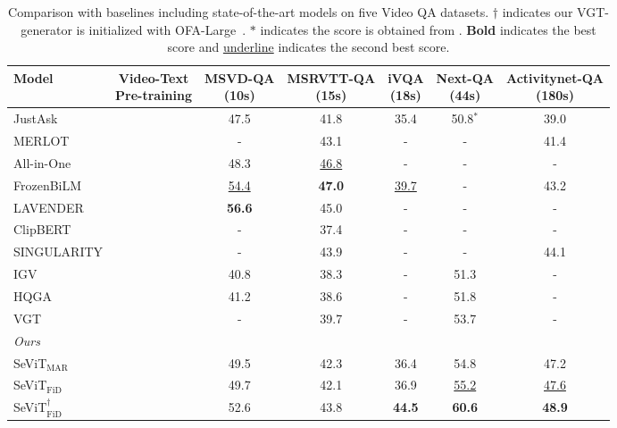 \documentclass{article}
\newcommand{\cmark}{\ding{51}}\newcommand{\xmark}{\ding{55}}\DeclareMathOperator*{\argsort}{argsort}
\newcommand{\frameworkname}{SeViT}
\begin{document}
\begin{table*}[t!]
    \centering
    \small
    \caption{Comparison with baselines including state-of-the-art models on five Video QA datasets. $\dagger$ indicates our VGT-generator is initialized with OFA-Large~\cite{wang2022unifying}. $*$ indicates the score is obtained from \citet{xiao2022videotransformer}. \textbf{Bold} indicates the best score and \underline{underline} indicates the second best score.}
    \vskip 0.15in
\begin{tabular}{lcccccc}
        \toprule
        Model & \makecell{Video-Text \\
        Pre-training} & \makecell{MSVD-QA \\ (10s)} & \makecell{MSRVTT-QA \\ (15s)} & \makecell{iVQA \\ (18s)}& \makecell{Next-QA \\ (44s)} & \makecell{Activitynet-QA \\ (180s)} \\
        \midrule
        JustAsk & \cmark & 47.5 & 41.8 & 35.4 & 50.8$^*$ & 39.0 \\
        MERLOT & \cmark & - & 43.1 & - & - & 41.4 \\
        All-in-One & \cmark & 48.3 & \underline{46.8} & - & - & - \\
        FrozenBiLM & \cmark & \underline{54.4} & \textbf{47.0} & \underline{39.7} & - & 43.2 \\
        LAVENDER& \cmark & \textbf{56.6} & 45.0 & - & - & - \\
        \midrule
        ClipBERT & \xmark & - & 37.4 & - & - & - \\
        SINGULARITY & \xmark & - & 43.9 & - & - & 44.1 \\
        IGV & \xmark & 40.8 & 38.3 & - & 51.3 & - \\
        HQGA & \xmark &  41.2 & 38.6 & - & 51.8 & - \\
        VGT & \xmark & - & 39.7 & - & 53.7 & - \\
        \midrule
        \textit{Ours} & & & & & & \\
\frameworkname{}$_\text{MAR}$ & \xmark & 49.5 & 42.3 & 36.4 & 54.8 & 47.2 \\
\frameworkname{}$_\text{FiD}$ & \xmark & 49.7 & 42.1 & 36.9 & \underline{55.2} & \underline{47.6} \\
\midrule
        \frameworkname{}$_\text{FiD}^{\dagger}$ & \xmark & 52.6 &  43.8 & \textbf{44.5} & \textbf{60.6} & \textbf{48.9} \\
        \bottomrule
    \end{tabular}
\label{table:main_result}
\end{table*} 
\end{document}
